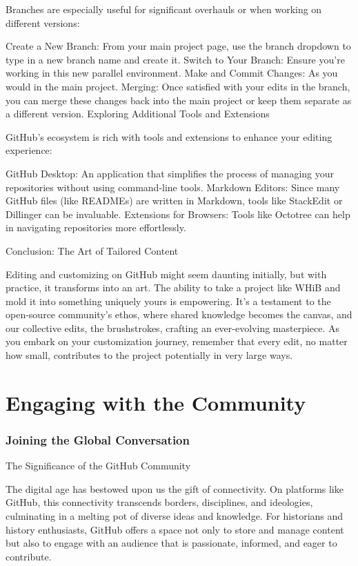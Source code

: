 \documentclass[a4paper,12pt]{book}
\begin{document}
Branches are especially useful for significant overhauls or when working on different versions:

Create a New Branch: From your main project page, use the branch dropdown to type in a new branch name and create it.
Switch to Your Branch: Ensure you're working in this new parallel environment.
Make and Commit Changes: As you would in the main project.
Merging: Once satisfied with your edits in the branch, you can merge these changes back into the main project or keep them separate as a different version.
Exploring Additional Tools and Extensions

GitHub's ecosystem is rich with tools and extensions to enhance your editing experience:

GitHub Desktop: An application that simplifies the process of managing your repositories without using command-line tools.
Markdown Editors: Since many GitHub files (like READMEs) are written in Markdown, tools like StackEdit or Dillinger can be invaluable.
Extensions for Browsers: Tools like Octotree can help in navigating repositories more effortlessly.

Conclusion: The Art of Tailored Content

Editing and customizing on GitHub might seem daunting initially, but with practice, it transforms into an art. The ability to take a project like WHiB and mold it into something uniquely yours is empowering. It's a testament to the open-source community's ethos, where shared knowledge becomes the canvas, and our collective edits, the brushstrokes, crafting an ever-evolving masterpiece. As you embark on your customization journey, remember that every edit, no matter how small, contributes to the project potentially in very large ways.

\chapter{Engaging with the Community}
\subsection*{Joining the Global Conversation}

The Significance of the GitHub Community

The digital age has bestowed upon us the gift of connectivity. On platforms like GitHub, this connectivity transcends borders, disciplines, and ideologies, culminating in a melting pot of diverse ideas and knowledge. For historians and history enthusiasts, GitHub offers a space not only to store and manage content but also to engage with an audience that is passionate, informed, and eager to contribute.
\end{document}
